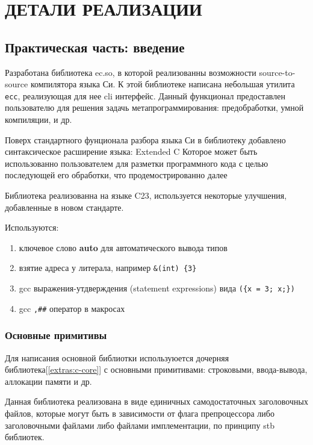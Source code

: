 \chapter{ДЕТАЛИ РЕАЛИЗАЦИИ}
\label{ch:ch2}

\section{Практическая часть: введение}

Разработана библиотека ec.so, в которой реализованны возможности source-to-source компилятора языка Си.
К этой библиотеке написана небольшая утилита \verb|ecc|, реализующая для нее cli интерфейс.
Данный функционал предоставлен пользователю для решения задачь метапрограммирования: предобработки, умной компиляции, и др.

Поверх стандартного фунционала разбора языка Си в библиотеку добавлено синтаксическое расширение языка: Extended C
Которое может быть использованно пользователем для разметки программного кода с целью последующей его обработки, что продемострированно далее 

Библиотека реализованна на языке C23, используется некоторые улучшения, добавленные в новом стандарте.

Используются:
\begin{enumerate}
  \item ключевое слово \textbf{auto} для автоматического вывода типов
  \item взятие адреса у литерала, например \verb|&(int) {3}|
  \item gcc выражения-утдверждения (statement expressions) вида \verb|({x = 3; x;})|
  \item gcc \verb|,##| оператор в макросах
\end{enumerate}


\subsection{Основные примитивы}
Для написания основной библиотки используюется дочерняя библиотека[\ref{extras:c-core}] с основными примитивами: 
строковыми, ввода-вывода, аллокации памяти и др.

Данная библиотека реализована в виде единичных самодостаточных заголовочных файлов, 
которые могут быть в зависимости от флага препроцессора либо заголовочными файлами либо файлами имплементации, 
по принципу stb библиотек\cite{stb_libs}.


